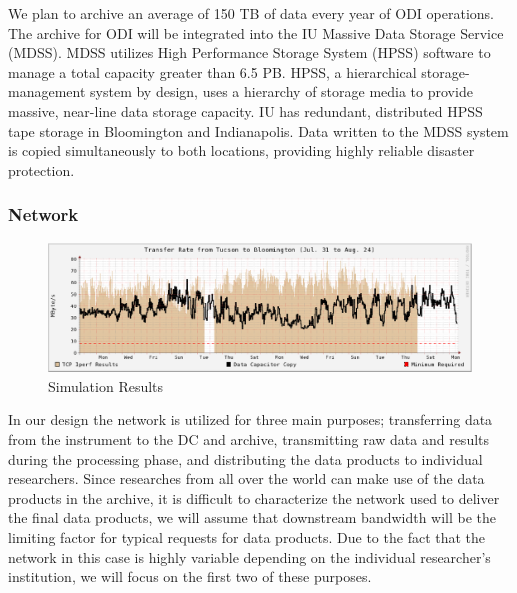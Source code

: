 \documentclass[10pt,conference]{IEEEtran}
\begin{document}
We plan to archive an average of 150 TB of data every year of ODI operations. The archive for ODI will be integrated into the IU Massive Data Storage Service (MDSS). MDSS utilizes High Performance Storage System (HPSS) software to manage a total capacity greater than 6.5 PB. HPSS, a hierarchical storage-management system by design, uses a hierarchy of storage media to provide massive, near-line data storage capacity. IU has redundant, distributed HPSS tape storage in Bloomington and Indianapolis. Data written to the MDSS system is copied simultaneously to both locations, providing highly reliable disaster protection. 

\subsubsection{Network}\label{sec:network}
\begin{figure}[t]
\centering
\includegraphics[width=6in]{network_throughput.eps}
\caption{Simulation Results}
\label{fig:network}
\end{figure}

In our design the network is utilized for three main purposes; transferring data from the instrument to the DC and archive, transmitting raw data and results during the processing phase, and distributing the data products to individual researchers. Since researches from all over the world can make use of the data products in the archive, it is difficult to characterize the network used to deliver the final data products, we will assume that downstream bandwidth will be the limiting factor for typical requests for data products. Due to the fact that the network in this case is highly variable depending on the individual researcher's institution, we will focus on the first two of these purposes. 
\end{document}
